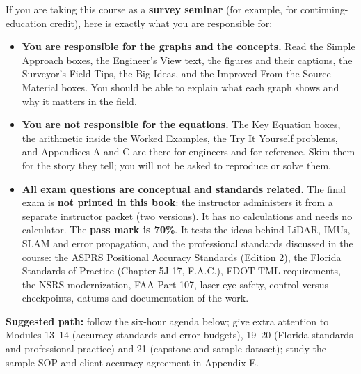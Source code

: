 \begin{seminar}
If you are taking this course as a \textbf{survey seminar} (for example, for continuing-education credit), here is exactly what you are responsible for:
\begin{itemize}
\item \textbf{You are responsible for the graphs and the concepts.} Read the Simple Approach boxes, the Engineer's View text, the figures and their captions, the Surveyor's Field Tips, the Big Ideas, and the Improved From the Source Material boxes. You should be able to explain what each graph shows and why it matters in the field.
\item \textbf{You are not responsible for the equations.} The Key Equation boxes, the arithmetic inside the Worked Examples, the Try It Yourself problems, and Appendices A and C are there for engineers and for reference. Skim them for the story they tell; you will not be asked to reproduce or solve them.
\item \textbf{All exam questions are conceptual and standards related.} The final exam is \textbf{not printed in this book}: the instructor administers it from a separate instructor packet (two versions). It has no calculations and needs no calculator. The \textbf{pass mark is 70\%}. It tests the ideas behind LiDAR, IMUs, SLAM and error propagation, and the professional standards discussed in the course: the ASPRS Positional Accuracy Standards (Edition 2), the Florida Standards of Practice (Chapter 5J-17, F.A.C.), FDOT TML requirements, the NSRS modernization, FAA Part 107, laser eye safety, control versus checkpoints, datums and documentation of the work.
\end{itemize}
\textbf{Suggested path:} follow the six-hour agenda below; give extra attention to Modules 13--14 (accuracy standards and error budgets), 19--20 (Florida standards and professional practice) and 21 (capstone and sample dataset); study the sample SOP and client accuracy agreement in Appendix E.
\end{seminar}


